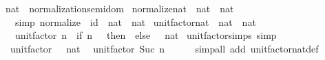 \begin{isabellebody}
%
\isadelimdocument
%
\endisadelimdocument
{}\isamarkupfalse%
\ nat\ {\isacharcolon}{\kern0pt}{\isacharcolon}{\kern0pt}\ normalization{\isacharunderscore}{\kern0pt}semidom\isanewline
{}\isanewline
\isanewline
{}\isamarkupfalse%
\ normalize{\isacharunderscore}{\kern0pt}nat\ {\isacharcolon}{\kern0pt}{\isacharcolon}{\kern0pt}\ {\isachardoublequoteopen}nat\ {\isasymRightarrow}\ nat{\isachardoublequoteclose}\isanewline
\ \ \ {\isacharbrackleft}{\kern0pt}simp{\isacharbrackright}{\kern0pt}{\isacharcolon}{\kern0pt}\ {\isachardoublequoteopen}normalize\ {\isacharequal}{\kern0pt}\ {\isacharparenleft}{\kern0pt}id\ {\isacharcolon}{\kern0pt}{\isacharcolon}{\kern0pt}\ nat\ {\isasymRightarrow}\ nat{\isacharparenright}{\kern0pt}{\isachardoublequoteclose}\isanewline
\isanewline
{}\isamarkupfalse%
\ unit{\isacharunderscore}{\kern0pt}factor{\isacharunderscore}{\kern0pt}nat\ {\isacharcolon}{\kern0pt}{\isacharcolon}{\kern0pt}\ {\isachardoublequoteopen}nat\ {\isasymRightarrow}\ nat{\isachardoublequoteclose}\isanewline
\ \ \ {\isachardoublequoteopen}unit{\isacharunderscore}{\kern0pt}factor\ n\ {\isacharequal}{\kern0pt}\ {\isacharparenleft}{\kern0pt}if\ n\ {\isacharequal}{\kern0pt}\ {}\ then\ {}\ else\ {}\ {\isacharcolon}{\kern0pt}{\isacharcolon}{\kern0pt}\ nat{\isacharparenright}{\kern0pt}{\isachardoublequoteclose}\isanewline
\isanewline
{}\isamarkupfalse%
\ unit{\isacharunderscore}{\kern0pt}factor{\isacharunderscore}{\kern0pt}simps\ {\isacharbrackleft}{\kern0pt}simp{\isacharbrackright}{\kern0pt}{\isacharcolon}{\kern0pt}\isanewline
\ \ {\isachardoublequoteopen}unit{\isacharunderscore}{\kern0pt}factor\ {}\ {\isacharequal}{\kern0pt}\ {\isacharparenleft}{\kern0pt}{}{\isacharcolon}{\kern0pt}{\isacharcolon}{\kern0pt}nat{\isacharparenright}{\kern0pt}{\isachardoublequoteclose}\isanewline
\ \ {\isachardoublequoteopen}unit{\isacharunderscore}{\kern0pt}factor\ {\isacharparenleft}{\kern0pt}Suc\ n{\isacharparenright}{\kern0pt}\ {\isacharequal}{\kern0pt}\ {}{\isachardoublequoteclose}\isanewline
%
\isadelimproof
\ \ %
\endisadelimproof
%
\isatagproof
{}\isamarkupfalse%
\ {\isacharparenleft}{\kern0pt}simp{\isacharunderscore}{\kern0pt}all\ add{\isacharcolon}{\kern0pt}\ unit{\isacharunderscore}{\kern0pt}factor{\isacharunderscore}{\kern0pt}nat{\isacharunderscore}{\kern0pt}def{\isacharparenright}{\kern0pt}%
\endisatagproof
{\isafoldproof}%
%
\isadelimproof
\isanewline
%
\endisadelimproof

\end{isabellebody}
